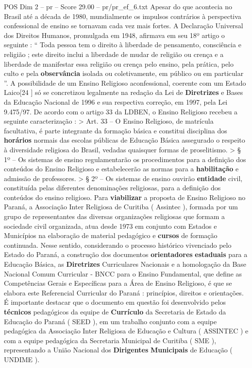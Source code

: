 \begin{textsample}{POS Dim 2 – pr – Score 29.00 – pr/pr\_ef\_6.txt}
Apesar do que acontecia no Brasil até a década de 1980, mundialmente os impulsos contrários à perspectiva confessional de ensino se tornavam cada vez mais fortes.
A Declaração Universal dos Direitos Humanos, promulgada em 1948, afirmava em seu 18º artigo o seguinte : “ Toda pessoa tem o direito à liberdade de pensamento, consciência e religião ; este direito inclui a liberdade de mudar de religião ou crença e a liberdade de manifestar essa religião ou crença pelo ensino, pela prática, pelo culto e pela \textbf{observância} isolada ou coletivamente, em público ou em particular ”.
A possibilidade de um Ensino Religioso aconfessional, coerente com um Estado Laico[24 ] só se concretizou legalmente na redação da Lei de \textbf{Diretrizes} e Bases da Educação Nacional de 1996 e sua respectiva correção, em 1997, pela Lei 9.475/97.
De acordo com o artigo 33 da LDBEN, o Ensino Religioso recebeu a seguinte caracterização : > Art. 33 – O Ensino Religioso, de matrícula facultativa, é parte integrante da formação básica e constitui disciplina dos \textbf{horários} normais das escolas públicas de Educação Básica assegurado o respeito à diversidade religiosa do Brasil, vedadas quaisquer formas de proselitismo. > § 1º – Os sistemas de ensino regulamentarão os procedimentos para a definição dos conteúdos do Ensino Religioso e estabelecerão as normas para a \textbf{habilitação} e admissão de professores. > § 2º – Os sistemas de ensino ouvirão \textbf{entidade} civil, constituída pelas diferentes denominações religiosas, para a definição dos conteúdos do ensino religioso.
Para \textbf{viabilizar} a proposta de Ensino Religioso no Paraná, a Associação Inter Religiosa de Curitiba ( Assintec ), formada por um grupo de representantes das diversas organizações religiosas que formam a sociedade civil organizada, atua desde 1973 em conjunto com Estados e Municípios na elaboração de material pedagógico e \textbf{cursos} de formação continuada.
Nesse sentido, considerando o processo histórico vivenciado pelo Estado do Paraná, a construção dos documentos \textbf{orientadores} \textbf{estaduais} para a Educação Básica, as \textbf{Diretrizes} Curriculares Nacionais e a homologação da Base Nacional Comum Curricular - BNCC para o Ensino Fundamental, que define as Competências Gerais e Específicas para a Área de Ensino Religioso, é que se elabora este Referencial Curricular do Paraná : princípios, direitos e orientações.
É importante destacar que o documento em questão foi desenvolvido pelos \textbf{técnicos} pedagógicos da equipe de \textbf{Currículo} da Secretaria de Estado da Educação do Paraná ( SEED ), em um trabalho conjunto com a equipe pedagógica da Associação Inter Religiosa de Educação e Cultura ( ASSINTEC ) e com a equipe pedagógica da Secretaria Municipal de Curitiba ( SME ), representando a União Nacional dos \textbf{Dirigentes} \textbf{Municipais} de Educação ( UNDIME ).

\end{textsample}
